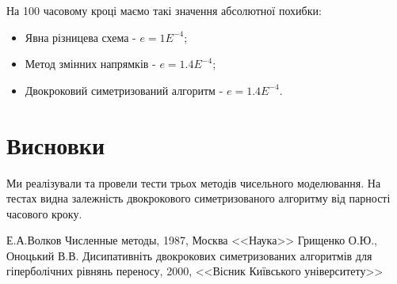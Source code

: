 \documentclass[a4paper,12pt]{article}
\begin{document}
На 100 часовому кроці маємо такі значення абсолютної похибки:
\begin{itemize}
	\item Явна різницева схема - $e = 1E^{-4}$;
	\item Метод змінних напрямків - $e = 1.4E^{-4}$;
	\item Двокроковий симетризований алгоритм - $e = 1.4E^{-4}$.
\end{itemize}


\newpage
\section{Висновки}

Ми реалізували та провели тести трьох методів чисельного моделювання. На тестах видна залежність двокрокового симетризованого алгоритму від парності часового кроку.

\begin{thebibliography}{}
	  Е.А.Волков Численные методы, 1987, Москва <<Наука>>
	 Грищенко О.Ю., Оноцький В.В. Дисипативніть двокрокових симетризованих алгоритмів для гіперболічних рівнянь переносу, 2000, <<Вісник Київського університету>>
\end{thebibliography}
\end{document}
